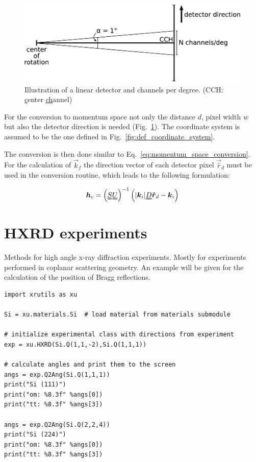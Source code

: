 \begin{figure}[H]
 \centering
 \includegraphics[width=0.6\linewidth]{pics/linear_detector_chpdeg}
 \caption{Illustration of a linear detector and channels per degree. (CCH: \underline{c}enter \underline{ch}annel)}
 \label{fig:detector_chpdeg}
\end{figure}

For the conversion to momentum space not only the distance $d$, pixel width $w$ but also the detector direction is needed (Fig.~\ref{fig:detector_chpdeg}). The coordinate system is assumed to be the one defined in Fig.~\ref{fig:def_coordinate_system}.

The conversion is then done similar to Eq.~\ref{eq:momentum_space_conversion}. For the calculation of $\vec k_f$ the direction vector of each detector pixel $\vec{\hat r}_d$ must be used in the conversion routine, which leads to the following formulation:

\begin{align}
\vec h_c = \left( \mat S \mat U \right)^{-1} \left(|\vec k_i| \mat D \vec{\hat r}_d - \vec k_i  \right)  
 \label{eq:momentum_space_conversion_detector}
\end{align}


\section{HXRD experiments}

Methods for high angle x-ray diffraction experiments. Mostly for experiments performed in coplanar scattering geometry. An example will be given for the calculation of the position of Bragg reflections.

\begin{lstlisting}[caption=calculation of angles for Si Bragg reflections]
import xrutils as xu

Si = xu.materials.Si  # load material from materials submodule

# initialize experimental class with directions from experiment
exp = xu.HXRD(Si.Q(1,1,-2),Si.Q(1,1,1))

# calculate angles and print them to the screen
angs = exp.Q2Ang(Si.Q(1,1,1))
print("Si (111)")
print("om: %8.3f" %angs[0])
print("tt: %8.3f" %angs[3])

angs = exp.Q2Ang(Si.Q(2,2,4))
print("Si (224)")
print("om: %8.3f" %angs[0])
print("tt: %8.3f" %angs[3])
\end{lstlisting}

